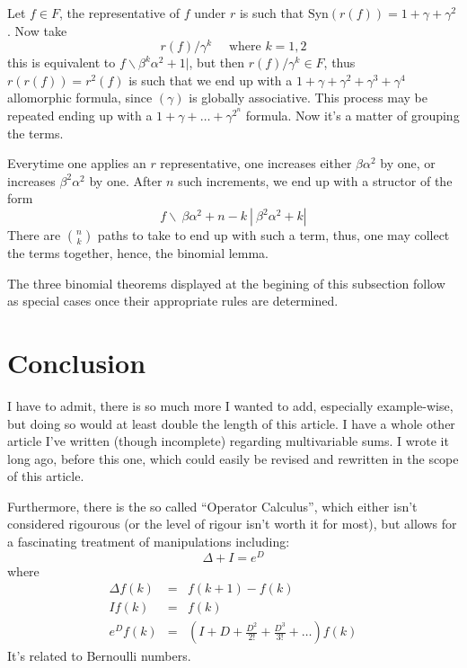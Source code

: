 \documentclass[twoside]{article}
\newenvironment{proof}[1][Proof]{\begin{trivlist}
\item[\hskip \labelsep {\bfseries #1}]}{\end{trivlist}}
\newcommand{\qed}{\nobreak \ifvmode \relax \else
      \ifdim\lastskip<1.5em \hskip-\lastskip
      \hskip1.5em plus0em minus0.5em \fi \nobreak
      \vrule height0.75em width0.5em depth0.25em\fi}
\begin{document}
\begin{proof}

Let $ f\in F $, the representative of $ f $ under $ r $ is such that $ \mbox{Syn}(r(f))=1+\gamma+\gamma^2 $.
Now take
$$ r(f)/\gamma^k\quad\mbox{ where } k=1,2 $$
this is equivalent to $ f\backslash\beta^k\alpha^2+1| $, but then $ r(f)/\gamma^k\in F $,
thus $ r(r(f))=r^2(f) $ is such that we end up with a $ 1+\gamma+\gamma^2+\gamma^3+\gamma^4 $
allomorphic formula, since $ (\gamma) $ is globally associative.  This process may be repeated
ending up with a $ 1+\gamma+\ldots+\gamma^{2^n} $ formula.  Now it's a matter of grouping the terms.

Everytime one applies an $ r $ representative, one increases either $ \beta\alpha^2 $ by one, or increases
$ \beta^2\alpha^2 $ by one.  After $ n $ such increments, we end up with a structor of the form
$$ f\backslash\ \beta\alpha^2+n-k\ |\ \beta^2\alpha^2+k| $$
There are $ {n\choose k} $ paths to take to end up with such a term, thus, one may collect the terms together,
hence, the binomial lemma.\qed

\end{proof}

The three binomial theorems displayed at the begining of this subsection follow as special cases once their appropriate
rules are determined.

\section{Conclusion}

I have to admit, there is so much more I wanted to add, especially example-wise, but doing so would at least double
the length of this article.  I have a whole other article I've written (though incomplete) regarding multivariable sums.
I wrote it long ago, before this one, which could easily be revised and rewritten in the scope of this article.

Furthermore, there is the so called ``Operator Calculus'', which either isn't considered rigourous (or the level of
rigour isn't worth it for most), but allows for a fascinating treatment of manipulations including:
$$ \Delta+I=e^{D} $$
where
\begin{eqnarray*}
\Delta f(k) & = & f(k+1)-f(k) \\
I f(k) & = & f(k) \\
e^{D}f(k) & = & (I+D+\frac{D^2}{2!}+\frac{D^3}{3!}+\ldots)f(k)
\end{eqnarray*}
It's related to Bernoulli numbers.
\end{document}
